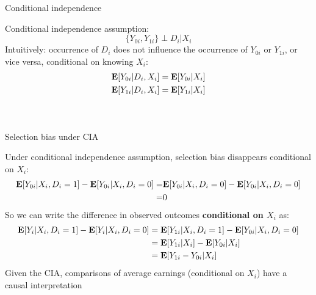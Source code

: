 \documentclass[compress, 8pt]{beamer}
\begin{document}
\begin{frame}{Conditional independence}

Conditional independence assumption: 
\begin{equation*}
    \{Y_{0i}, Y_{1i}\} \perp D_i \vert X_i
\end{equation*}
Intuitively: occurrence of $D_i$ does not influence the occurrence of $Y_{0i}$ or $Y_{1i}$, or vice versa, conditional on knowing $X_i$:
\begin{align*}
    \mathbf{E}[Y_{0i} \vert D_i, X_i] &= \mathbf{E} [Y_{0i} \vert X_i] \\
    \mathbf{E}[Y_{1i} \vert D_i, X_i] &= \mathbf{E} [Y_{1i} \vert X_i] 
\end{align*}

\begin{columns}
\begin{figure}
\end{figure}

\begin{figure}
\end{figure}

\end{columns}

\end{frame}


\begin{frame}{Selection bias under CIA}

Under conditional independence assumption, selection bias disappears conditional on $X_i$:
\begin{align*}
    \mathbf{E} [Y_{0i} \vert X_i, D_i = 1] - \mathbf{E} [Y_{0i} \vert X_i, D_i = 0]
    =& \mathbf{E} [Y_{0i} \vert X_i, D_i = 0] - \mathbf{E} [Y_{0i} \vert X_i, D_i = 0] \\
    =& 0
\end{align*}
So we can write the difference in observed outcomes \textbf{conditional on $X_i$} as:
\begin{align*}
    \mathbf{E} [Y_i \vert X_i, D_i = 1] - \mathbf{E} [Y_i \vert X_i, D_i = 0] 
    &= \mathbf{E} [Y_{1i} \vert X_i, D_i = 1] - \mathbf{E} [Y_{0i} \vert X_i, D_i = 0] \\
    &= \mathbf{E} [Y_{1i} \vert X_i] - \mathbf{E} [Y_{0i} \vert X_i] \\
    &= \mathbf{E} [Y_{1i} - Y_{0i} \vert X_i]
\end{align*}
Given the CIA, comparisons of average earnings (conditional on $X_i$) have a causal interpretation
\end{frame}
\end{document}
